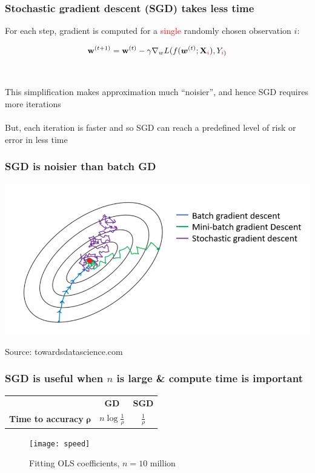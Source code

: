 \documentclass{beamer}
\begin{document}
\begin{frame}
	\frametitle{Stochastic gradient descent (SGD) takes less time}

	For each step, gradient is computed for a \textcolor{red}{single} randomly
	chosen observation $i$:

	$$
	{\mathbf{w}^{(t+1)}} = \mathbf{w}^{(t)} - \gamma \nabla_w
	L(f(\bm{w}^{(t)}; \mathbf{X}_{\textcolor{red}{i}}), Y_{\textcolor{red}{i})}
	$$ \\~\\

	This simplification makes approximation much ``noisier'', and hence SGD
	requires more iterations \\~\\

	But, each iteration is faster and so SGD can reach a predefined
	level of risk or error in less time
\end{frame}

\begin{frame}
\frametitle{SGD is noisier than batch GD}
	\centering
	\includegraphics[scale=0.3]{noise}

	\tiny Source: towardsdatascience.com
\end{frame}

\begin{frame}
	\frametitle{SGD is useful when $n$ is large \& compute
	time is important}
	\begin{table}[t]
		\begin{tabular}{|l|c|c|}
			\hline
			& \textbf{GD} & \textbf{SGD} \\
			\textbf{Time to accuracy} $\mathbf{\rho}$ & $n \log
			\frac{1}{\rho}$ & $\frac{1}{\rho}$ \\
			\hline
		\end{tabular}
	\end{table}

	\begin{figure}
		\caption{Fitting OLS coefficients, $n=10$ million}
	\centering
	\texttt{[image: speed]}
	\end{figure}

			
\end{frame}
\end{document}
